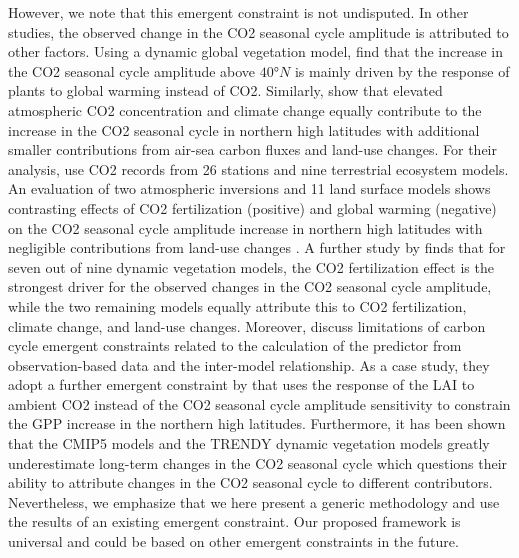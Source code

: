 However, we note that this emergent constraint is not undisputed. In other
studies, the observed change in the \ac{CO2} seasonal cycle amplitude is
attributed to other factors. Using a dynamic global vegetation model,
\textcite{Forkel2016} find that the increase in the \ac{CO2} seasonal cycle
amplitude above $40 \unit{\degree N}$ is mainly driven by the response of
plants to global warming instead of \ac{CO2}. Similarly, \textcite{Piao2018}
show that elevated atmospheric \acs{CO2} concentration and climate change
equally contribute to the increase in the \ac{CO2} seasonal cycle in northern
high latitudes with additional smaller contributions from air-sea carbon fluxes
and land-use changes. For their analysis, \textcite{Piao2018} use \ac{CO2}
records from 26 stations and nine terrestrial ecosystem models. An evaluation
of two atmospheric inversions and 11 land surface models shows contrasting
effects of \ac{CO2} fertilization (positive) and global warming (negative) on
the \ac{CO2} seasonal cycle amplitude increase in northern high latitudes with
negligible contributions from land-use changes \autocite{Bastos2019}. A further
study by \textcite{Zhao2016} finds that for seven out of nine dynamic
vegetation models, the \ac{CO2} fertilization effect is the strongest driver
for the observed changes in the \ac{CO2} seasonal cycle amplitude, while the
two remaining models equally attribute this to \ac{CO2} fertilization, climate
change, and land-use changes. Moreover, \textcite{Winkler2019a} discuss
limitations of carbon cycle emergent constraints related to the calculation of
the predictor from observation-based data and the inter-model relationship. As
a case study, they adopt a further emergent constraint by
\textcite{Winkler2019} that uses the response of the \ac{LAI} to ambient
\ac{CO2} instead of the \ac{CO2} seasonal cycle amplitude sensitivity to
constrain the \ac{GPP} increase in the northern high latitudes. Furthermore, it
has been shown that the \acs{CMIP}5 models \autocite{Graven2013} and the TRENDY
dynamic vegetation models \autocite{Thomas2016} greatly underestimate long-term
changes in the \ac{CO2} seasonal cycle which questions their ability to
attribute changes in the \ac{CO2} seasonal cycle to different contributors.
Nevertheless, we emphasize that we here present a generic methodology and use
the results of an existing emergent constraint. Our proposed framework is
universal and could be based on other emergent constraints in the future.

